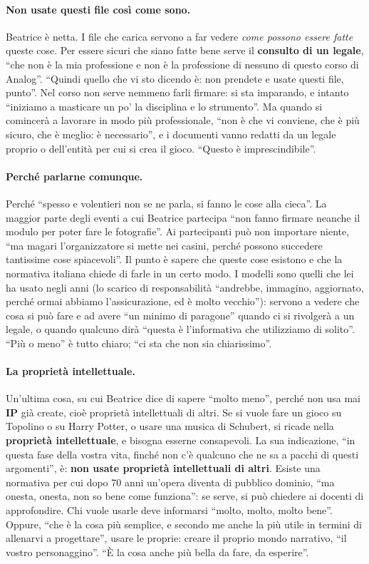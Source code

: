 \paragraph{Non usate questi file così come sono.} Beatrice è netta. I file che carica
servono a far vedere \emph{come possono essere fatte} queste cose. Per essere sicuri
che siano fatte bene serve il \textbf{consulto di un legale}, ``che non è la mia
professione e non è la professione di nessuno di questo corso di Analog''. ``Quindi
quello che vi sto dicendo è: non prendete e usate questi file, punto''. Nel corso non
serve nemmeno farli firmare: si sta imparando, e intanto ``iniziamo a masticare un po'
la disciplina e lo strumento''. Ma quando si comincerà a lavorare in modo più
professionale, ``non è che vi conviene, che è più sicuro, che è meglio: è necessario'',
e i documenti vanno redatti da un legale proprio o dell'entità per cui si crea il gioco.
``Questo è imprescindibile''.

\paragraph{Perché parlarne comunque.} Perché ``spesso e volentieri non se ne parla, si
fanno le cose alla cieca''. La maggior parte degli eventi a cui Beatrice partecipa
``non fanno firmare neanche il modulo per poter fare le fotografie''. Ai partecipanti
può non importare niente, ``ma magari l'organizzatore si mette nei casini, perché
possono succedere tantissime cose spiacevoli''. Il punto è sapere che queste cose
esistono e che la normativa italiana chiede di farle in un certo modo. I modelli sono
quelli che lei ha usato negli anni (lo scarico di responsabilità ``andrebbe, immagino,
aggiornato, perché ormai abbiamo l'assicurazione, ed è molto vecchio''): servono a
vedere che cosa si può fare e ad avere ``un minimo di paragone'' quando ci si rivolgerà
a un legale, o quando qualcuno dirà ``questa è l'informativa che utilizziamo di
solito''. ``Più o meno'' è tutto chiaro; ``ci sta che non sia chiarissimo''.

\paragraph{La proprietà intellettuale.} Un'ultima cosa, su cui Beatrice dice di sapere
``molto meno'', perché non usa mai \textbf{IP} già create, cioè proprietà
intellettuali di altri. Se si vuole fare un gioco su Topolino o su Harry Potter, o
usare una musica di Schubert, si ricade nella \textbf{proprietà intellettuale}, e
bisogna esserne consapevoli. La sua indicazione, ``in questa fase della vostra vita,
finché non c'è qualcuno che ne sa a pacchi di questi argomenti'', è: \textbf{non usate
proprietà intellettuali di altri}. Esiste una normativa per cui dopo 70 anni un'opera
diventa di pubblico dominio, ``ma onesta, onesta, non so bene come funziona'': se
serve, si può chiedere ai docenti di approfondire. Chi vuole usarle deve informarsi
``molto, molto, molto bene''. Oppure, ``che è la cosa più semplice, e secondo me anche
la più utile in termini di allenarvi a progettare'', usare le proprie: creare il
proprio mondo narrativo, ``il vostro personaggino''. ``È la cosa anche più bella da
fare, da esperire''.

